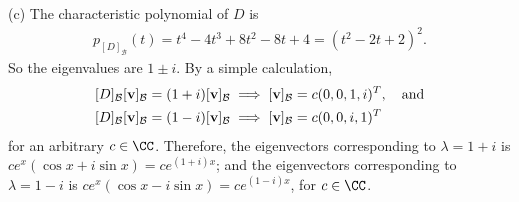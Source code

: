 \documentclass{homework}
\begin{document}
{    \noindent(c) The characteristic polynomial of $D$ is
    \begin{align*}
        p_{[D]_{\mathcal B}}(t) = t^4 - 4t^3 + 8t^2 - 8t + 4 = (t^2-2t+2)^2.
    \end{align*}
    So the eigenvalues are $1\pm i$. By a simple calculation,
    \begin{align*}
         & [D]_{\mathcal B}[\mathbf v]_{\mathcal B} = (1+i)[\mathbf v]_{\mathcal B} \implies [\mathbf v]_{\mathcal B} = c (0, 0, 1, i)^T,\text{\quad and} \\
         & [D]_{\mathcal B}[\mathbf v]_{\mathcal B} = (1-i)[\mathbf v]_{\mathcal B} \implies [\mathbf v]_{\mathcal B} = c (0, 0, i, 1)^T
    \end{align*}
    for an arbitrary $c\in\CC$.
    Therefore, the eigenvectors corresponding to $\lambda = 1+i$ is $ce^x(\cos x + i\sin x) = ce^{(1+i)x}$; and the eigenvectors corresponding to $\lambda = 1-i$ is $ce^x(\cos x - i\sin x) = ce^{(1-i)x}$, for $c\in\CC$.
}
\end{document}
